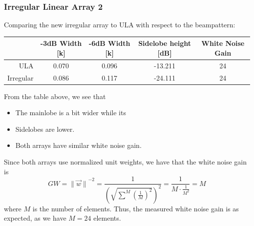 \documentclass[compress]{beamer}
\newcommand{\norm}[1]{\ensuremath{\lVert#1\rVert}}
\begin{document}
\begin{frame} %
    \frametitle{Irregular Linear Array 2}
    Comparing the new irregular array to ULA with respect to the beampattern:
    \begin{table}[]
        \tiny
        \begin{tabular}{r|c|c|c|c}
          & -3dB Width {[}k{]} & -6dB Width {[}k{]} & Sidelobe height {[}dB{]} & White Noise Gain \\ \hline
            ULA       & 0.070              & 0.096              & -13.211                  & 24   \\ \hline
            Irregular & 0.086              & 0.117              & -24.111                  & 24              
        \end{tabular}
    \end{table}
    From the table above, we see that 
    \begin{itemize}
        \item The mainlobe is a bit wider while its
        \item Sidelobes are lower. 
        \item Both arrays have similar white noise gain.
    \end{itemize}
    Since both arrays use normalized unit weights, we have that the white noise
    gain is 
    \begin{equation*}
        GW = \norm{\vec{w}}^{-2} = \frac{1}{\left(\sqrt{\sum^{M}{\left(\frac{1}{M}\right)^2}}\right)^2}
        = \frac{1}{M\cdot \frac{1}{M^2}} = M
    \end{equation*}
    where $M$ is the number of elements. Thus, the measured white noise gain is
    as expected, as we have $M=24$ elements.
\end{frame} %
\end{document}
